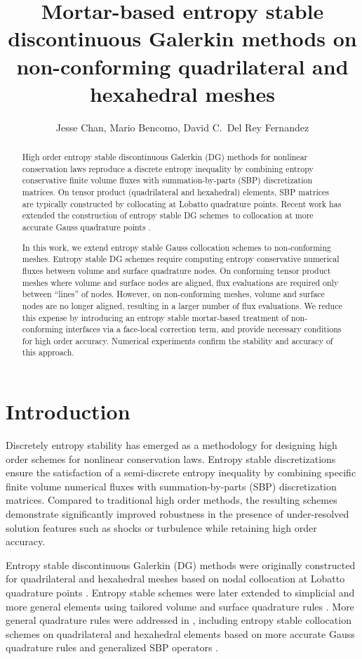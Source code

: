 \documentclass{svjour3}                     %
\date{}
\author{Jesse Chan, Mario Bencomo, David C.\ Del Rey Fernandez}
\title{Mortar-based entropy stable discontinuous Galerkin methods on non-conforming quadrilateral and hexahedral meshes}
\begin{document}
\maketitle

\begin{abstract}
High order entropy stable discontinuous Galerkin (DG) methods for nonlinear conservation laws reproduce a discrete entropy inequality by combining entropy conservative finite volume fluxes with summation-by-parts (SBP) discretization matrices.  On tensor product (quadrilateral and hexahedral) elements, SBP matrices are typically constructed by collocating at Lobatto quadrature points.  Recent work has extended the construction of entropy stable DG schemes to collocation at more accurate Gauss quadrature points \cite{chan2018efficient}.  

In this work, we extend entropy stable Gauss collocation schemes to non-conforming meshes.  Entropy stable DG schemes require computing entropy conservative numerical fluxes between volume and surface quadrature nodes.  On conforming tensor product meshes where volume and surface nodes are aligned, flux evaluations are required only between ``lines'' of nodes.  However, on non-conforming meshes, volume and surface nodes are no longer aligned, resulting in a larger number of flux evaluations.  We reduce this expense by introducing an entropy stable mortar-based treatment of non-conforming interfaces via a face-local correction term, and provide necessary conditions for high order accuracy.  Numerical experiments confirm the stability and accuracy of this approach.  
\end{abstract}



\section{Introduction}
Discretely entropy stability has emerged as a methodology for designing high order schemes for nonlinear conservation laws.  Entropy stable discretizations ensure the satisfaction of a semi-discrete entropy inequality by combining specific finite volume numerical fluxes with summation-by-parts (SBP) discretization matrices.  Compared to traditional high order methods, the resulting schemes demonstrate significantly improved robustness in the presence of under-resolved solution features such as shocks or turbulence while retaining high order accuracy.  

Entropy stable discontinuous Galerkin (DG) methods were originally constructed for quadrilateral and hexahedral meshes based on nodal collocation at Lobatto quadrature points \cite{fisher2013high, carpenter2014entropy, gassner2016split}.  Entropy stable schemes were later extended to simplicial and more general elements using tailored volume and surface quadrature rules \cite{chen2017entropy, crean2018entropy}.   More general quadrature rules were addressed in \cite{chan2017discretely, chan2018discretely, chan2018efficient, chan2019skew}, including entropy stable collocation schemes on quadrilateral and hexahedral elements based on more accurate Gauss quadrature rules and generalized SBP operators \cite{chan2018efficient}.
\end{document}

